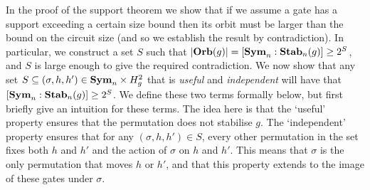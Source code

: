 \documentclass[../paper.tex]{subfiles}
\begin{document}



In the proof of the support theorem we show that if we assume a gate has a
support exceeding a certain size bound then its orbit must be larger than the
bound on the circuit size (and so we establish the result by contradiction). In
particular, we construct a set $S$ such that $\vert \text{\textbf{Orb}}(g) \vert = [\text{\textbf{Sym}}_n :
\text{\textbf{Stab}}_n(g)] \geq 2^S$, and $S$ is large enough to give the required
contradiction. We now show that any set $S \subseteq (\sigma, h, h') \in \text{\textbf{Sym}}_n
\times H^2_g$ that is \emph{useful} and \emph{independent} will have that
$[\text{\textbf{Sym}}_n : \text{\textbf{Stab}}_n(g)] \geq 2^S$. We define these two terms formally below, but
first briefly give an intuition for these terms. The idea here is that the
`useful' property ensures that the permutation does not stabilise $g$. The
`independent' property ensures that for any $(\sigma, h, h') \in S$, every other
permutation in the set fixes both $h$ and $h'$ and the action of $\sigma$ on $h$
and $h'$. This means that $\sigma$ is the only permutation that moves $h$ or
$h'$, and that this property extends to the image of these gates under $\sigma$.


  
\end{document}
